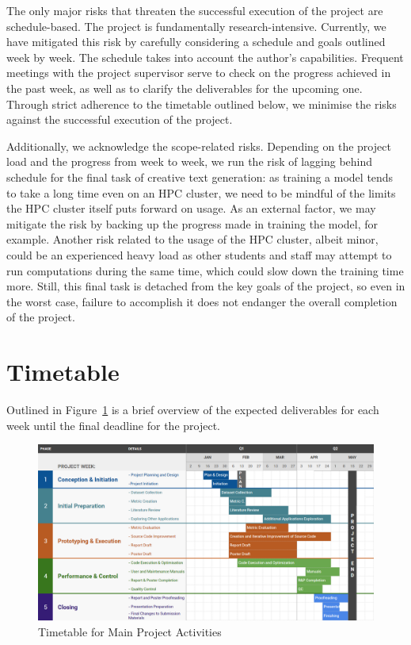\documentclass[a4paper,12pt]{article}
\newcommand{\ajs}[1]{\textcolor{orange}{[AJS: #1]}}
\begin{document}
The only major risks that threaten the successful execution of the project are schedule-based. The project is fundamentally research-intensive. Currently, we have mitigated this risk by carefully considering a schedule and goals outlined week by week. The schedule takes into account the author's capabilities.
Frequent meetings with the project supervisor serve to check on the progress achieved in the past week, as well as to clarify the deliverables for the upcoming one. Through strict adherence to the timetable outlined below, we minimise the risks against the successful execution of the project. 

Additionally, we acknowledge the scope-related risks. Depending on the project load and the progress from week to week, we run the risk of lagging behind schedule for the final task of creative text generation: as training a model tends to take a long time even on an HPC cluster, we need to be mindful of the limits the HPC cluster itself puts forward on usage. As an external factor, we may mitigate the risk by backing up the progress made in training the model, for example. Another risk related to the usage of the HPC cluster, albeit minor, could be an experienced heavy load as other students and staff may attempt to run computations during the same time, which could slow down the training time more. Still, this final task is detached from the key goals of the project, so even in the worst case, failure to accomplish it does not endanger the overall completion of the project.   

\section*{Timetable}
Outlined in Figure~\ref{fig:plan} is a brief overview of the expected deliverables for each week until the final deadline for the project.

\begin{figure}[htb!]
\begin{center}
\includegraphics[width=\textwidth]{plan.png}
\caption{Timetable for Main Project Activities \label{fig:plan}}
\end{center}
\end{figure}


\end{document}
